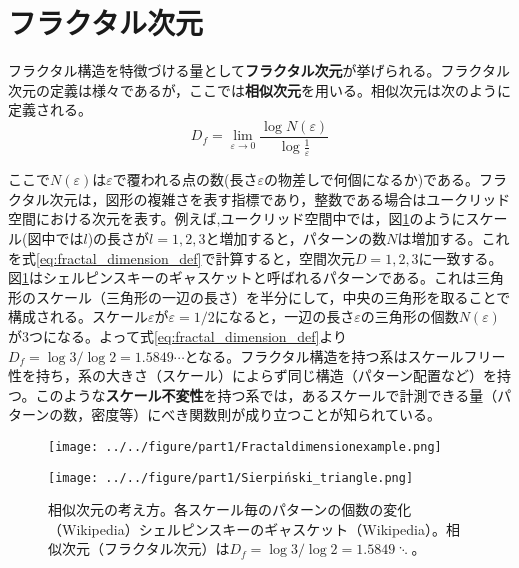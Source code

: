 \documentclass[autodetect-engine,dvi=dvipdfmx,a4paper,ja=standard,oneside,openany,11pt,draft]{bxjsbook}
\begin{document}
\section{フラクタル次元}
\label{sec:fractal_dimension}
フラクタル構造を特徴づける量として\textbf{フラクタル次元}が挙げられる。フラクタル次元の定義は様々であるが，ここでは\textbf{相似次元}を用いる。相似次元は次のように定義される。
\begin{equation}
  D_f=\lim_{\varepsilon \to 0}\frac{\log N(\varepsilon)}{\log \frac{1}{\varepsilon}}
  \label{eq:fractal_dimension_def}
\end{equation}

ここで$N(\varepsilon)$は$\varepsilon$で覆われる点の数(長さ$\varepsilon$の物差しで何個になるか)である。フラクタル次元は，図形の複雑さを表す指標であり，整数である場合はユークリッド空間における次元を表す。例えば,ユークリッド空間中では，図\ref{fig:fractal_stracture}のようにスケール(図中では$l$)の長さが$l=1,2,3$と増加すると，パターンの数$N$は増加する。これを式\ref{eq:fractal_dimension_def}で計算すると，空間次元$D=1,2,3$に一致する。図\ref{fig:fractal_stracture}はシェルピンスキーのギャスケットと呼ばれるパターンである。これは三角形のスケール（三角形の一辺の長さ）を半分にして，中央の三角形を取ることで構成される。スケール$\varepsilon$が$\varepsilon=1/2$になると，一辺の長さ$\varepsilon$の三角形の個数$N(\varepsilon)$が3つになる。よって式\ref{eq:fractal_dimension_def}より$D_f=\log 3/\log 2=1.5849\cdots$となる。フラクタル構造を持つ系はスケールフリー性を持ち，系の大きさ（スケール）によらず同じ構造（パターン配置など）を持つ。このような\textbf{スケール不変性}を持つ系では，あるスケールで計測できる量（パターンの数，密度等）にべき関数則が成り立つことが知られている。

\begin{figure}[htbp]
  \begin{minipage}{0.45\textwidth}
    \centering
    \subcaption{}
    \texttt{[image: ../../figure/part1/Fractaldimensionexample.png]}
    \label{fig:相似次元の考え方}
  \end{minipage}
  \begin{minipage}{0.45\textwidth}
    \centering
    \subcaption{}
    \texttt{[image: ../../figure/part1/Sierpiński\_triangle.png]}
    \label{fig:シェルピンスキーのギャスケット}
  \end{minipage}
  \caption{相似次元の考え方。各スケール毎のパターンの個数の変化（Wikipedia）シェルピンスキーのギャスケット（Wikipedia）。相似次元（フラクタル次元）は$D_f=\log 3/\log 2=1.5849\ddots$。}
  \label{fig:fractal_stracture}
\end{figure}
\end{document}
